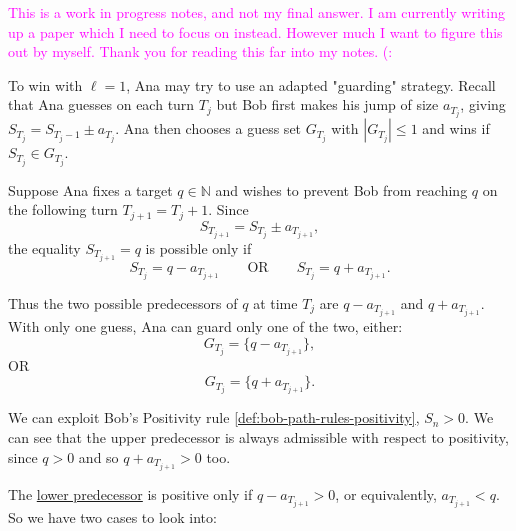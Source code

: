 \textcolor{magenta}{This is a work in progress notes, and not my final answer. I am currently writing up a paper which I need to focus on instead. However much I want to figure this out by myself. Thank you for reading this far into my notes. (: }

\vspace{5mm}

To win with $\ell=1$, Ana may try to use an adapted "guarding"
strategy. Recall that Ana guesses on each turn $T_j$ but Bob first makes his jump of size $a_{T_j}$, giving $S_{T_j}=S_{T_j-1}\pm a_{T_j}$. Ana then chooses a guess set $G_{T_j}$ with $|G_{T_j}|\leq1$ and wins if $S_{T_j}\in G_{T_j}$.

Suppose Ana fixes a target $q\in\mathbb N$ and wishes to prevent Bob
from reaching $q$ on the following turn $T_{j+1}=T_j+1$. Since
\[
S_{T_{j+1}}
=
S_{T_j}\pm a_{T_{j+1}},
\]
the equality $S_{T_{j+1}}=q$ is possible only if
\[
S_{T_j}=q-a_{T_{j+1}}
\qquad\text{OR}\qquad
S_{T_j}=q+a_{T_{j+1}}.
\]

\noindent
Thus the two possible predecessors of $q$ at time $T_j$ are $q-a_{T_{j+1}}$ and $q+a_{T_{j+1}}$. With only one guess, Ana can guard only one of the two, either:
\begin{equation}\label{eqn:ana-guess-ell1-minus}
G_{T_j}=\{q-a_{T_{j+1}}\},
\end{equation}
OR
\begin{equation}\label{eqn:ana-guess-ell1-plus}
G_{T_j}=\{q+a_{T_{j+1}}\}.
\end{equation}

We can exploit Bob's Positivity rule \ref{def:bob-path-rules-positivity}, $S_n>0$. We can see that the upper predecessor is always admissible with respect to positivity,
since $q>0$ and so $q+a_{T_{j+1}}>0$ too. 

\noindent
The \ul{lower predecessor} is positive only if $q-a_{T_{j+1}}>0$,  or equivalently, $a_{T_{j+1}}<q$. So we have two cases to look into: 

